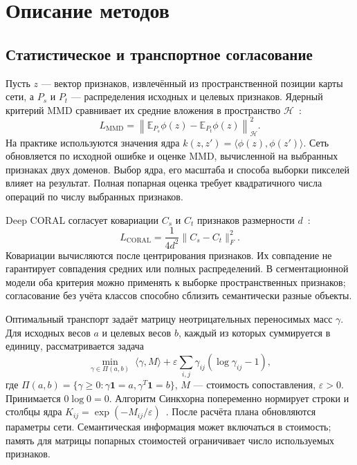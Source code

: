 \section{Описание методов}
\subsection{Статистическое и транспортное согласование}
Пусть $z$ --- вектор признаков, извлечённый из пространственной позиции карты сети, а $P_s$ и $P_t$ --- распределения исходных и целевых признаков. Ядерный критерий MMD сравнивает их средние вложения в пространство $\mathcal H$~\cite{mmd}:
\begin{equation}
 L_{\mathrm{MMD}}=\left\|\mathbb E_{P_s}\phi(z)-\mathbb E_{P_t}\phi(z)\right\|_{\mathcal H}^2.
\end{equation}
На практике используются значения ядра $k(z,z')=\langle\phi(z),\phi(z')\rangle$. Сеть обновляется по исходной ошибке и оценке MMD, вычисленной на выбранных признаках двух доменов. Выбор ядра, его масштаба и способа выборки пикселей влияет на результат. Полная попарная оценка требует квадратичного числа операций по числу выбранных признаков.

Deep CORAL согласует ковариации $C_s$ и $C_t$ признаков размерности $d$~\cite{coral}:
\begin{equation}
 L_{\mathrm{CORAL}}=\frac{1}{4d^2}\|C_s-C_t\|_F^2.
\end{equation}
Ковариации вычисляются после центрирования признаков. Их совпадение не гарантирует совпадения средних или полных распределений. В сегментационной модели оба критерия можно применять к выборке пространственных признаков; согласование без учёта классов способно сблизить семантически разные объекты.

Оптимальный транспорт задаёт матрицу неотрицательных переносимых масс $\gamma$. Для исходных весов $a$ и целевых весов $b$, каждый из которых суммируется в единицу, рассматривается задача
\begin{equation}
 \min_{\gamma\in\Pi(a,b)}\;
 \langle\gamma,M\rangle+\varepsilon\sum_{i,j}\gamma_{ij}(\log\gamma_{ij}-1),
\end{equation}
где $\Pi(a,b)=\{\gamma\geq0:\gamma\mathbf1=a,\gamma^T\mathbf1=b\}$, $M$ --- стоимость сопоставления, $\varepsilon>0$. Принимается $0\log0=0$. Алгоритм Синкхорна попеременно нормирует строки и столбцы ядра $K_{ij}=\exp(-M_{ij}/\varepsilon)$~\cite{sinkhorn}. После расчёта плана обновляются параметры сети. Семантическая информация может включаться в стоимость; память для матрицы попарных стоимостей ограничивает число используемых признаков.

